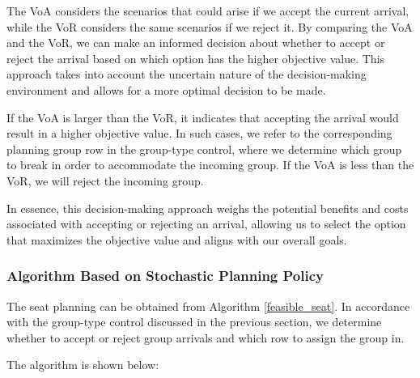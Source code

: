 The VoA considers the scenarios that could arise if we accept the current arrival, while the VoR considers the same scenarios if we reject it. By comparing the VoA and the VoR, we can make an informed decision about whether to accept or reject the arrival based on which option has the higher objective value. This approach takes into account the uncertain nature of the decision-making environment and allows for a more optimal decision to be made. 

If the VoA is larger than the VoR, it indicates that accepting the arrival would result in a higher objective value. In such cases, we refer to the corresponding planning group row in the group-type control, where we determine which group to break in order to accommodate the incoming group. If the VoA is less than the VoR, we will reject the incoming group.

In essence, this decision-making approach weighs the potential benefits and costs associated with accepting or rejecting an arrival, allowing us to select the option that maximizes the objective value and aligns with our overall goals.


\subsubsection{Algorithm Based on Stochastic Planning Policy}
The seat planning can be obtained from Algorithm \ref{feasible_seat}. In accordance with the group-type control discussed in the previous section, we determine whether to accept or reject group arrivals and which row to assign the group in.

The algorithm is shown below:


